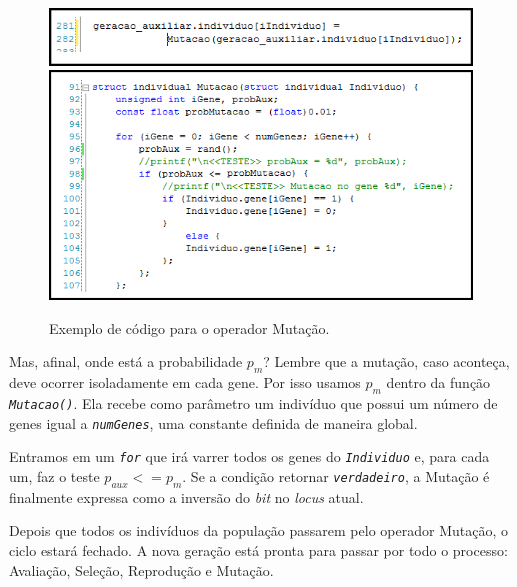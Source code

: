	\begin{figure}[htp]
		\begin{center}
			\includegraphics[width=13cm]{figs/ga/CodigoMutacao.png}
			\includegraphics[width=13cm]{figs/ga/CodigoMutacaoFunc.png}
		\end{center}
		\caption{\label{figCodMutacao}Exemplo de código para o operador Mutação.}
	\end{figure}
		
	Mas, afinal, onde está a probabilidade $p_m$? Lembre que a mutação, caso aconteça, deve ocorrer isoladamente em cada gene. Por isso usamos $p_m$ dentro da função \textit{\texttt{Mutacao()}}. Ela recebe como parâmetro um indivíduo que possui um número de genes igual a \textit{\texttt{numGenes}}, uma constante definida de maneira global.
	
	Entramos em um \textit{\texttt{for}} que irá varrer todos os genes do \textit{\texttt{Individuo}} e, para cada um, faz o teste $p_{aux} <= p_m$. Se a condição retornar \textit{\texttt{verdadeiro}}, a Mutação é finalmente expressa como a inversão do \textit{bit} no \textit{locus} atual.
	
	Depois que todos os indivíduos da população passarem pelo operador Mutação, o ciclo estará fechado. A nova geração está pronta para passar por todo o processo: Avaliação, Seleção, Reprodução e Mutação.